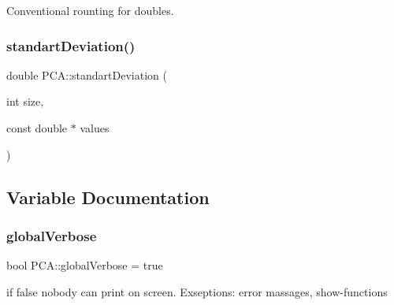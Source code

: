 Conventional rounting for doubles. 

\hypertarget{namespace_p_c_a_ae9120f4f9875a87768cc3090196892a8}{}\label{namespace_p_c_a_ae9120f4f9875a87768cc3090196892a8} 
\subsubsection{\texorpdfstring{standart\+Deviation()}{standartDeviation()}}
{\footnotesize\ttfamily double P\+C\+A\+::standart\+Deviation (\begin{DoxyParamCaption}\item[{int}]{size,  }\item[{const double $\ast$}]{values }\end{DoxyParamCaption})}



\subsection{Variable Documentation}
\hypertarget{namespace_p_c_a_a01cf2b18a2d7669f5be721c2142bf67d}{}\label{namespace_p_c_a_a01cf2b18a2d7669f5be721c2142bf67d} 
\subsubsection{\texorpdfstring{global\+Verbose}{globalVerbose}}
{\footnotesize\ttfamily bool P\+C\+A\+::global\+Verbose = true}



if false nobody can print on screen. Exseptions\+: error massages, show-\/functions 

